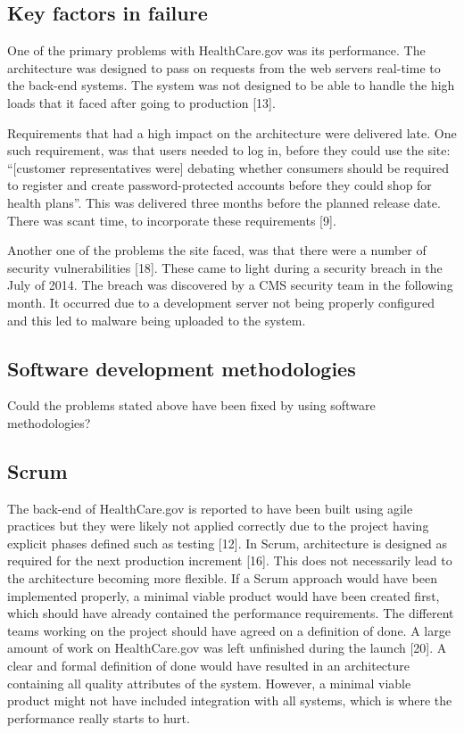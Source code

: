 \documentclass[]{article}
\begin{document}
\subsection{Key factors in failure}\label{key-factors-in-failure-1}

One of the primary problems with HealthCare.gov was its performance. The
architecture was designed to pass on requests from the web servers
real-time to the back-end systems. The system was not designed to be
able to handle the high loads that it faced after going to production
{[}13{]}.

Requirements that had a high impact on the architecture were delivered
late. One such requirement, was that users needed to log in, before they
could use the site: ``{[}customer representatives were{]} debating
whether consumers should be required to register and create
password-protected accounts before they could shop for health plans''.
This was delivered three months before the planned release date. There
was scant time, to incorporate these requirements {[}9{]}.

Another one of the problems the site faced, was that there were a number
of security vulnerabilities {[}18{]}. These came to light during a
security breach in the July of 2014. The breach was discovered by a CMS
security team in the following month. It occurred due to a development
server not being properly configured and this led to malware being
uploaded to the system.

\subsection{Software development
methodologies}\label{software-development-methodologies}

Could the problems stated above have been fixed by using software
methodologies?

\subsection{Scrum}\label{scrum-1}

The back-end of HealthCare.gov is reported to have been built using
agile practices but they were likely not applied correctly due to the
project having explicit phases defined such as testing {[}12{]}. In
Scrum, architecture is designed as required for the next production
increment {[}16{]}. This does not necessarily lead to the architecture
becoming more flexible. If a Scrum approach would have been implemented
properly, a minimal viable product would have been created first, which
should have already contained the performance requirements. The
different teams working on the project should have agreed on a
definition of done. A large amount of work on HealthCare.gov was left
unfinished during the launch {[}20{]}. A clear and formal definition of
done would have resulted in an architecture containing all quality
attributes of the system. However, a minimal viable product might not
have included integration with all systems, which is where the
performance really starts to hurt.
\end{document}
